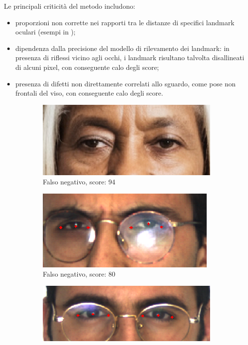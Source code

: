 \documentclass[12pt,a4paper,openright,twoside]{book}
\begin{document}
Le principali criticità del metodo includono:
\begin{itemize}
    \item proporzioni non corrette nei rapporti tra le distanze di specifici landmark oculari (esempi in );
    \item dipendenza dalla precisione del modello di rilevamento dei landmark: in presenza di riflessi vicino agli occhi, i landmark risultano talvolta disallineati di alcuni pixel, con conseguente calo degli score;
    \item presenza di difetti non direttamente correlati allo sguardo, come pose non frontali del viso, con conseguente calo degli score.
\end{itemize}

\begin{figure}[htbp]
    \centering
    \begin{subfigure}{0.49\textwidth}
        \centering
        \includegraphics[width=.7\linewidth]{figures/frontal-gaze-algo-false-negative-94-1.png}
        \caption{Falso negativo, score: 94}
        \label{fig:frontal_gaze_algo_weakness_1}
    \end{subfigure}
    \hfill
    \begin{subfigure}{0.49\textwidth}
        \centering
        \includegraphics[width=.7\linewidth]{figures/frontal-gaze-algo-false-negative-80-2.png}
        \caption{Falso negativo, score: 80}
        \label{fig:frontal_gaze_algo_weakness_2}
    \end{subfigure}
    \begin{subfigure}{0.49\textwidth}
        \centering
        \includegraphics[width=.7\linewidth]{figures/frontal-gaze-algo-false-negative-0-3.png}

\end{subfigure}
\end{figure}
\end{document}
